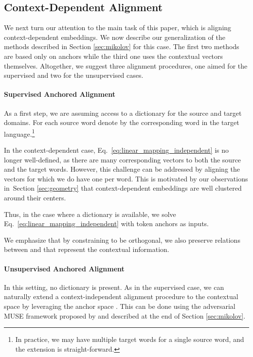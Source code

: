 \documentclass[11pt,a4paper]{article}
\newcommand{\comment}[1]{}
\newcommand{\secref}[1]{Section \ref{#1}}
\renewcommand{\eqref}[1]{Eq.~\ref{#1}}
\begin{document}
\subsection{Context-Dependent Alignment} \label{sec:supervised}

We next turn our attention to the main task of this paper, which is aligning context-dependent embeddings. We now describe our generalization of the methods described in \secref{sec:mikolov} for this case. The first two methods are based only on anchors while the third one uses the contextual vectors themselves. Altogether, we suggest three alignment procedures, one aimed for the supervised and two for the unsupervised cases.

\paragraph{Supervised Anchored Alignment} As a first step, we are assuming access to a dictionary for the source and target domains. For each source word  denote by  the corresponding word in the target language.\footnote{In practice, we may have multiple target words for a single source word, and the extension is straight-forward.}



In the context-dependent case, \eqref{eq:linear_mapping_independent} is no longer well-defined, as there are many corresponding vectors to both the source and the target words.
However, this challenge can be  addressed by aligning the vectors  for which we do have one per word. This is motivated by our observations in~\secref{sec:geometry} that context-dependent embeddings are well clustered around their centers.

Thus, in the case where a dictionary is available, we solve \eqref{eq:linear_mapping_independent} with token anchors as inputs.
\comment{

we shall obtain the alignment as follows. First, we solve the following optimization problem:


Thereafter, we use the above matrix to obtain target-language embeddings via \eqref{eq:alignment}.

}

We emphasize that by constraining  to be orthogonal, we also preserve relations between  and  that represent the contextual information.





\paragraph{Unsupervised Anchored Alignment}
In this setting, no dictionary is present.
As in the supervised case, we can naturally extend a context-independent alignment procedure to the contextual space by leveraging the anchor space . This can be done using the adversarial MUSE framework proposed by \citet{conneau2017word} and described at the end of \secref{sec:mikolov}.
\end{document}
